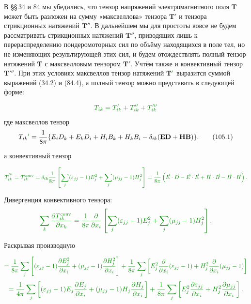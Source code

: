 \documentclass[a4paper,10pt]{article}
\newcommand{\redtext}[1]{\textcolor{redcolor}{#1}}
\newcommand{\modtext}[1]{\textcolor{modcolor}{#1}}
\newcommand{\modmath}[1]{\textcolor{modcolor}{#1}}
\begin{document}

В §§\,34 и 84 мы убедились, что тензор напряжений электромагнитного
поля $\mathbf{T}$ может быть разложен на сумму «максвеллова» тензора
$\mathbf{T}'$ и тензора стрикционных натяжений $\mathbf{T}''$. \redtext{В
дальнейшем мы для простоты вовсе не будем рассматривать стрикционных
натяжений $\mathbf{T}''$, приводящих лишь к перераспределению
пондеромоторных сил по объёму находящихся в поле тел, но не изменяющих
результирующей этих сил, и будем отождествлять} полный тензор натяжений
$\mathbf{T}$ с максвелловым тензором $\mathbf{T}'$. \modtext{Учтём также и конвективный тензор $\mathbf{T}'''$}. При этих условиях \modtext{максвеллов}
тензор натяжений $\mathbf{T\modmath{'}}$ выразится суммой выражений (34.2) и (84.4),
\modtext{а полный тензор}
можно представить в следующей форме:

$$
\modmath{T_{ik} = T_{ik}'+T_{ik}''+T_{ik}'''}
$$
\modtext{где максвеллов тензор}
\begin{equation}
    T_{ik}\modmath{'} = \frac{1}{8\pi}\{E_i D_k + E_k D_i + H_i B_k + H_k B_i
           - \delta_{ik}(\mathbf{ED} + \mathbf{HB})\}.
    \tag{105.1}
\end{equation}

\modtext{а конвективный тензор}

$$
\modmath{T^{'''}_{ik} = T^{\text{conv}}_{ik} = \delta_{ik} \frac{1}{8\pi}\left[\sum_j (\varepsilon_{jj}-1)E_j^2 + \sum_j (\mu_{jj}-1)H_j^2\right] = \frac{1}{8\pi}\left(\vec E \cdot \vec D - \vec E \cdot \vec E + \vec H \cdot \vec B - \vec H \cdot \vec H\right).}  %
$$

\modtext{Дивергенция конвективного тензора:}
$$
\modmath{\sum_k \frac{\partial T^{\text{conv}}_{ik}}{\partial x_k} = \frac{1}{8\pi}\frac{\partial}{\partial x_i}\left[\sum_j (\varepsilon_{jj}-1)E_j^2 + \sum_j (\mu_{jj}-1)H_j^2\right].}
$$

\modtext{
Раскрывая производную %
}

$$
\modmath{= \frac{1}{8\pi}\sum_j\left[(\varepsilon_{jj}-1)\frac{\partial E_j^2}{\partial x_i} + (\mu_{jj}-1)\frac{\partial H_j^2}{\partial x_i}\right]
+ \frac{1}{8\pi}\sum_j\left[ E_j^2\frac{\partial}{\partial x_i}(\varepsilon_{jj}-1) + H_j^2\frac{\partial}{\partial x_i}(\mu_{jj}-1)\right]}
$$
$$
\modmath{= \frac{1}{4\pi}\sum_j\left[(\varepsilon_{jj}-1)E_j\frac{\partial E_j}{\partial x_i} + (\mu_{jj}-1)H_j\frac{\partial H_j}{\partial x_i}\right]
+ \frac{1}{8\pi}\sum_j\left[ E_j^2\frac{\partial \varepsilon_{jj}}{\partial x_i} + H_j^2\frac{\partial \mu_{jj}}{\partial x_i}\right].}
$$
\end{document}
